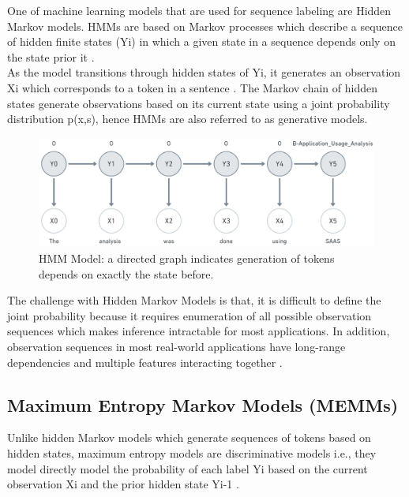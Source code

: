 One of machine learning models that are used for sequence labeling are Hidden Markov models. HMMs are based on Markov processes which describe a sequence of hidden finite states (Yi) in which a given state in a sequence depends only on the state prior it \citep{aggarwal2018machine, gagniuc2017markov}. \\

As the model transitions through hidden states of Yi, it generates an observation Xi which corresponds to a token in a sentence \citep{aggarwal2018machine}. The Markov chain of hidden states generate observations based on its current state using a joint probability distribution p(x,s), hence HMMs are also referred to as generative models. \\

\begin{figure}[htbp]
	\centering
	\includegraphics[width=1\textwidth]{4.graphics/figures/ch_5/HMM}
	\caption{\ac{HMM} Model: a directed graph indicates generation of tokens depends on exactly the state before.}
	\label{fig:chapter03:setup}
\end{figure}


The challenge with Hidden Markov Models is that, it is difficult to define the joint probability because it requires enumeration of all possible observation sequences which makes inference intractable for most applications. In addition, observation sequences in most real-world applications have long-range dependencies and multiple features interacting together \citep{bulla2006application, wallach2004conditional}.
 
\subsection{Maximum Entropy Markov Models (\ac{MEMM}s)}
\label{sec:chapter05:MLModels:MEMMs}

Unlike hidden Markov models which generate sequences of tokens based on hidden states, maximum entropy models are discriminative models i.e., they model directly model the probability of each label Yi based on the current observation Xi and the prior hidden state Yi-1 \citep{mccallum2000maximum}. 

